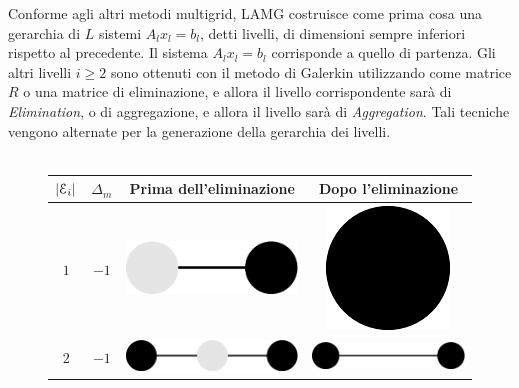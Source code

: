 Conforme agli altri metodi multigrid, LAMG costruisce come prima cosa una gerarchia di $L$ sistemi $A_l x_l = b_l$, detti livelli, di dimensioni sempre inferiori rispetto al precedente. Il sistema $A_lx_l = b_l$ corrisponde a quello di partenza. 
Gli altri livelli $i\geq 2$ sono ottenuti con il metodo di Galerkin utilizzando come matrice $R$ o una matrice di eliminazione, e allora il livello corrispondente sarà di \emph{Elimination}, o di aggregazione, e allora il livello sarà di \emph{Aggregation}.
Tali tecniche vengono alternate per la generazione della gerarchia dei livelli.\\
\\
\begin{figure}
\centering
\begin{tabular}{cccc}
\toprule
$|\mathcal{E}_i|$ & $\Delta_m$ & Prima dell'eliminazione & Dopo l'eliminazione \\
\midrule
$1$ & $-1$ & \includegraphics[height=0.015\textheight]{Grafica/el-A} & \includegraphics[height=0.015\textheight]{Grafica/el-B}\\
\midrule
$2$ & $-1$ & \includegraphics[height=0.015\textheight]{Grafica/el-C} & \includegraphics[height=0.015\textheight]{Grafica/el-D}\\

\end{tabular}
\end{figure}
